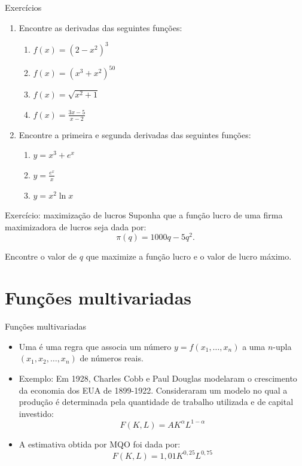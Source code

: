 \documentclass[10pt]{beamer}
\begin{document}
\begin{frame}
    {Exercícios}
    \begin{enumerate}
        \item Encontre as derivadas das seguintes funções:\medskip
        \begin{enumerate}
            \item $f(x) = (2 - x^2)^3$ \medskip
            \item $f(x) = (x^3 + x^2)^{50}$ \medskip
            \item $f(x) = \sqrt{x^2 + 1}$ \medskip
            \item $f(x) = \frac{3x - 5}{x - 2}$ \bigskip
        \end{enumerate}
        \item Encontre a primeira e segunda derivadas das seguintes funções:\medskip
        \begin{enumerate}
            \item $y = x^3 + e^x$\medskip
            \item $y = \frac{e^x}{x}$\medskip
            \item $y = x^2 \ln x$
        \end{enumerate}
    \end{enumerate}
\end{frame}

\begin{frame}
    {Exercício: maximização de lucros}
    Suponha que a função lucro de uma firma maximizadora de lucros seja dada por:
    \[
      \pi(q) = 1000q - 5q^2.  
    \] \bigskip

    Encontre o valor de $q$ que maximize a função lucro e o valor de lucro máximo.
\end{frame}

\section{Funções multivariadas}
\begin{frame}
    {Funções multivariadas}
    \begin{itemize}
        \item Uma  é uma regra que associa um número $y = f(x_1, \dots, x_n)$ a uma $n$-upla $(x_1, x_2, \dots, x_n)$ de números reais. \bigskip
        \item Exemplo: Em 1928, Charles Cobb e Paul Douglas modelaram o crescimento da economia dos EUA de 1899-1922. Consideraram um modelo no qual a produção é determinada pela quantidade de trabalho utilizada e de capital investido:
        \[
          F(K, L) = A K^\alpha L^{1 - \alpha}  
        \]
        \item A estimativa obtida por MQO foi dada por:
        \[
            F(K, L) = 1,01 K^{0,25} L^{0,75}  
        \]
    \end{itemize}
\end{frame}
\end{document}
